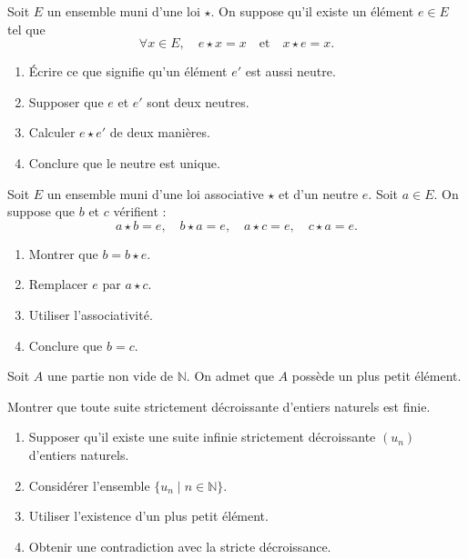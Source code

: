 \documentclass[11pt,a4paper]{article}
\newcommand{\N}{\mathbb{N}}
\begin{document}
\begin{exercicebox}
Soit \(E\) un ensemble muni d'une loi \(\star\). On suppose qu'il existe un élément \(e\in E\) tel que
\[
\forall x\in E,\quad e\star x=x\quad\text{et}\quad x\star e=x.
\]

\begin{enumerate}[label=\alph*)]
    \item Écrire ce que signifie qu'un élément \(e'\) est aussi neutre.
    \item Supposer que \(e\) et \(e'\) sont deux neutres.
    \item Calculer \(e\star e'\) de deux manières.
    \item Conclure que le neutre est unique.
\end{enumerate}
\end{exercicebox}

\begin{exercicebox}
Soit \(E\) un ensemble muni d'une loi associative \(\star\) et d'un neutre \(e\). Soit \(a\in E\). On suppose que \(b\) et \(c\) vérifient :
\[
a\star b=e,\quad b\star a=e,\quad a\star c=e,\quad c\star a=e.
\]

\begin{enumerate}[label=\alph*)]
    \item Montrer que \(b=b\star e\).
    \item Remplacer \(e\) par \(a\star c\).
    \item Utiliser l'associativité.
    \item Conclure que \(b=c\).
\end{enumerate}
\end{exercicebox}

\begin{exercicebox}
Soit \(A\) une partie non vide de \(\N\). On admet que \(A\) possède un plus petit élément.

Montrer que toute suite strictement décroissante d'entiers naturels est finie.

\begin{enumerate}[label=\alph*)]
    \item Supposer qu'il existe une suite infinie strictement décroissante \((u_n)\) d'entiers naturels.
    \item Considérer l'ensemble \(\{u_n\mid n\in\N\}\).
    \item Utiliser l'existence d'un plus petit élément.
    \item Obtenir une contradiction avec la stricte décroissance.
\end{enumerate}
\end{exercicebox}
\end{document}
